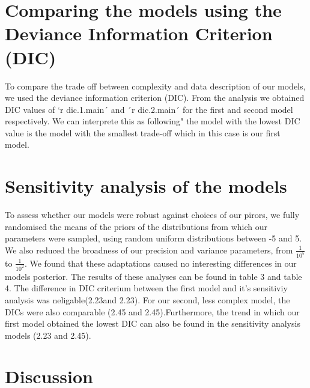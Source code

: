 \documentclass[man]{apa6}
\theoremstyle{definition}
\theoremstyle{definition}
\theoremstyle{definition}
\theoremstyle{remark}
\begin{document}
\hypertarget{comparing-the-models-using-the-deviance-information-criterion-dic}{%
\section{Comparing the models using the Deviance Information Criterion
(DIC)}\label{comparing-the-models-using-the-deviance-information-criterion-dic}}

To compare the trade off between complexity and data description of our
models, we used the deviance information criterion (DIC). From the
analysis we obtained DIC values of `r dic.1.main´ and ´r dic.2.main´ for
the first and second model respectively. We can interprete this as
following" the model with the lowest DIC value is the model with the
smallest trade-off which in this case is our first model.

\hypertarget{sensitivity-analysis-of-the-models}{%
\section{Sensitivity analysis of the
models}\label{sensitivity-analysis-of-the-models}}

To assess whether our models were robust against choices of our pirors,
we fully randomised the means of the priors of the distributions from
which our parameters were sampled, using random uniform distributions
between -5 and 5. We also reduced the broadness of our precision and
variance parameters, from \(\frac {1}{10^5}\) to \(\frac {1}{10^2}\). We
found that these adaptations caused no interesting differences in our
models posterior. The results of these analyses can be found in table 3
and table 4. The difference in DIC criterium between the first model and
it's sensitiviy analysis was neligable(2.23and 2.23). For our second,
less complex model, the DICs were also comparable (2.45 and
2.45).Furthermore, the trend in which our first model obtained the
lowest DIC can also be found in the sensitivity analysis models (2.23
and 2.45).

\hypertarget{discussion}{%
\section{Discussion}\label{discussion}}
\end{document}
